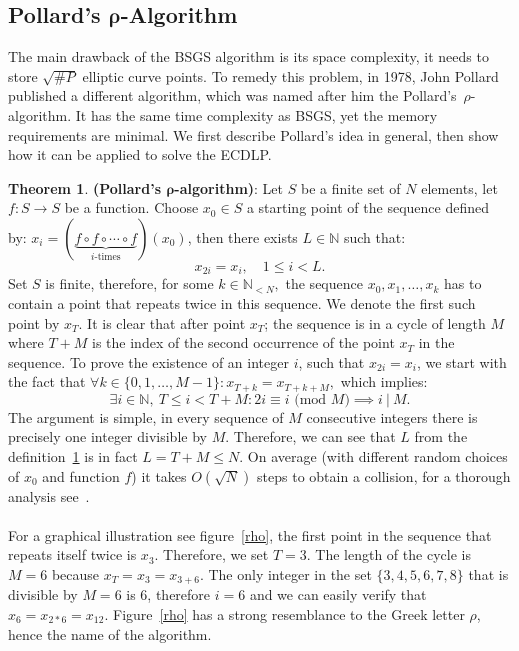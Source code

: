 \documentclass[thesis=M,english]{FITthesis}[2012/10/20]
\theoremstyle{remark}
\theoremstyle{definition}
\newtheorem{theorem}{Theorem}[section]
\begin{document}
\subsection{Pollard's $\boldsymbol\rho$-Algorithm} \label{rhoText}
\noindent The main drawback of the BSGS algorithm is its space complexity, it needs to store $\sqrt{\#P}$ elliptic curve points. To remedy this problem, in 1978, John Pollard published a different algorithm, which was named after him the Pollard's~$\rho$-algorithm. It has the same time complexity as BSGS, yet the memory requirements are minimal. We first describe Pollard's idea in general, then show how it can be applied to solve the ECDLP.
\begin{theorem}
\label{pol}
 \textbf{(Pollard's $\boldsymbol\rho$-algorithm)}: Let $S$ be a finite set of $N$ elements, let $f: S \to S$ be a function. Choose $x_0 \in S$ a starting point of the sequence defined by: $x_i = (\underbrace{f\circ f \circ \cdots \circ f}_\text{$i$-times})(x_0)$, then there exists $L \in \mathbb{N}$ such that:
 $$
 x_{2i} = x_i, \quad 1\leq i < L.
 $$
Set $S$ is finite, therefore, for some $k \in \mathbb{N}_{< N},$ the sequence $x_0, x_1, \ldots, x_k$ has to contain a point that repeats twice in this sequence. We denote the first such point by $x_T$. It is clear that after point $x_T$; the sequence is in a cycle of length $M$ where $T+M$ is the index of the second occurrence of the point $x_T$ in the sequence. To prove the existence of an integer $i$, such that $x_{2i} = x_i$, we start with the fact that $\forall k \in \{0, 1, \ldots, M-1\}: x_{T+k} = x_{T+k+M},$ which implies:
$$
\exists i \in \mathbb{N},\ T \leq i < T + M: 2i \equiv i \text{ (mod $M$)} \implies i\ |\ M.
$$
The argument is simple, in every sequence of $M$ consecutive integers there is precisely one integer divisible by $M$. Therefore, we can see that $L$ from the definition~\ref{pol} is in fact $L= T + M \leq N$. On average (with different random choices of $x_0$ and function $f$) it takes $O(\sqrt{N})$ steps to obtain a collision, for a thorough analysis see~\cite{polProb}. \\ \\
\noindent For a graphical illustration see figure~\ref{rho}, the first point in the sequence that repeats itself twice is $x_3$. Therefore, we set $T = 3$. The length of the cycle is $M = 6$ because $x_T = x_3 = x_{3+6}$. The only integer in the set $\{3,4,5,6,7,8\}$ that is divisible by $M = 6$ is $6$, therefore $i=6$ and we can easily verify that $x_6 = x_{2*6} = x_{12}$. Figure~\ref{rho} has a strong resemblance to the Greek letter $\rho$, hence the name of the algorithm.

\end{theorem}
\end{document}
